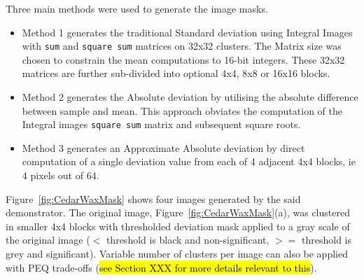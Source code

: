 \documentclass[journal]{IEEEtran}
\begin{document}
Three main methods were used to generate the image masks. 
\begin{itemize}
\item Method 1 generates the traditional Standard deviation using Integral Images with \texttt{sum} and \texttt{square sum} matrices on 32x32 clusters. The Matrix size was chosen to constrain the mean computations to 16-bit integers. These 32x32 matrices are further sub-divided into optional 4x4, 8x8 or 16x16 blocks.
\item Method 2 generates the Absolute deviation by utilising the absolute difference between sample and mean. This approach obviates the computation of the Integral images \texttt{square sum} matrix and subsequent square roots. 
\item Method 3 generates an Approximate Absolute deviation by direct computation of a single deviation value from each of 4 adjacent 4x4 blocks, ie 4 pixels out of 64.
\end{itemize}
Figure~\ref{fig:CedarWaxMask} shows four images generated by the said demonstrator. The original image, Figure~\ref{fig:CedarWaxMask}(a), was clustered in smaller 4x4 blocks with thresholded deviation mask applied to a gray scale of the original image ($<$ threshold is black and non-significant, $>=$ threshold is grey and significant). Variable number of clusters per image can also be applied with PEQ trade-offs (\hl{see Section XXX for more details relevant to this}).
\end{document}
